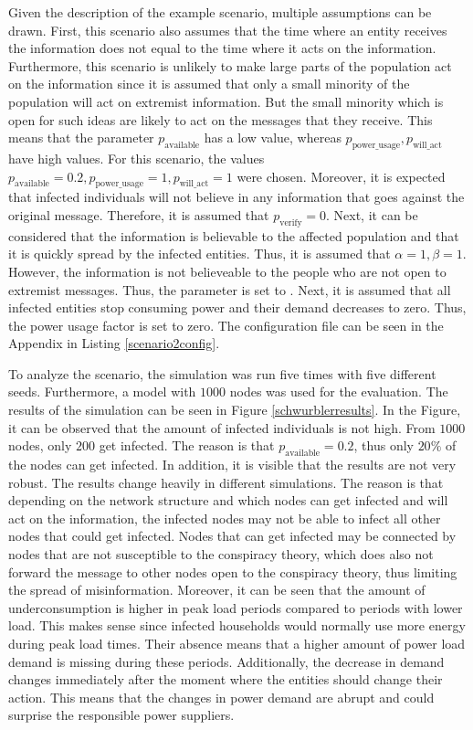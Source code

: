 Given the description of the example scenario, multiple assumptions can be drawn.
First, this scenario also assumes that the time where an entity receives the
information does not equal to the time where it acts on the information.
Furthermore, this scenario is unlikely to make large parts of the population
act on the information since it is assumed that only a small minority
of the population will act on extremist information. But the small 
minority which is open for such ideas are likely to act on the 
messages that they receive.
This means that the parameter $p_{\mathrm{available}}$ has a low value,
whereas $p_{\mathrm{power\_usage}}, p_{\mathrm{will\_act}}$
have high values. For this scenario, the values 
$p_{\mathrm{available}}=0.2, 
p_{\mathrm{power\_usage}}=1, p_{\mathrm{will\_act}}=1$
were chosen.
Moreover, it is expected that infected individuals will not 
believe in any information that goes against the original message.
Therefore, it is assumed that $p_{\mathrm{verify}}=0$. Next, it
can be considered that the information is believable to 
the affected population and that it is quickly spread by 
the infected entities. Thus, it is assumed that $\alpha=1, \beta=1$.
However, the information is not believeable to the people 
who are not open to extremist messages. Thus, the 
parameter  is set to .
Next, it is assumed that all infected entities 
stop consuming power and their demand decreases to zero. Thus,
the power usage factor  is set to zero.
The configuration file can be seen in the Appendix in
Listing \ref{scenario2config}.

To analyze the scenario, the simulation was run five times with five 
different seeds. Furthermore, a model with $1000$ nodes was used 
for the evaluation. 
The results of the simulation can be seen in
Figure \ref{schwurblerresults}. In the Figure, it can be 
observed that the amount of infected individuals is not high.
From $1000$ nodes, only $200$ get infected. The reason is 
that $p_{\mathrm{available}}=0.2$, thus only $20\%$ of the nodes
can get infected. In addition, it is visible that the results 
are not very robust. The results change heavily in different 
simulations. The reason is that depending on the network structure
and which nodes can get infected and will act on the information, 
the infected nodes may not be able to infect all other nodes
that could get infected. Nodes that can get infected may be 
connected by nodes that are not susceptible to the conspiracy 
theory, which does also not forward the message to other nodes
open to the conspiracy theory, thus limiting the 
spread of misinformation.
Moreover, it can be seen that the amount of underconsumption
is higher in peak load periods compared to periods with 
lower load. This makes sense since infected households would 
normally use more energy during peak load times. Their absence
means that a higher amount of power load demand is missing 
during these periods. Additionally, the decrease in demand 
changes immediately after the moment where the entities 
should change their action. This means that the changes 
in power demand are abrupt and could surprise the responsible 
power suppliers.

